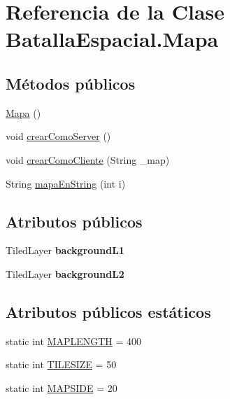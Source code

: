 \hypertarget{classBatallaEspacial_1_1Mapa}{
\section{Referencia de la Clase BatallaEspacial.Mapa}
\label{classBatallaEspacial_1_1Mapa}
}
\subsection*{Métodos públicos}
\begin{DoxyCompactItemize}
\item 
\hyperlink{classBatallaEspacial_1_1Mapa_a263ca7605285004b543d10fcfbec0539}{Mapa} ()
\item 
void \hyperlink{classBatallaEspacial_1_1Mapa_ace2f89758638fbe11ca1a0eed398602a}{crearComoServer} ()
\item 
void \hyperlink{classBatallaEspacial_1_1Mapa_ac69c177517360e24fe57a152615e0498}{crearComoCliente} (String \_\-map)
\item 
String \hyperlink{classBatallaEspacial_1_1Mapa_ad96b5ce682c66c4e8c60803a9c4c6e0c}{mapaEnString} (int i)
\end{DoxyCompactItemize}
\subsection*{Atributos públicos}
\begin{DoxyCompactItemize}
\item 
\hypertarget{classBatallaEspacial_1_1Mapa_aa452d9ae5f493e72cc34b623ed59f354}{
TiledLayer {\bfseries backgroundL1}}
\label{classBatallaEspacial_1_1Mapa_aa452d9ae5f493e72cc34b623ed59f354}

\item 
\hypertarget{classBatallaEspacial_1_1Mapa_a4d33bf24630a89471b56521e1058e5f3}{
TiledLayer {\bfseries backgroundL2}}
\label{classBatallaEspacial_1_1Mapa_a4d33bf24630a89471b56521e1058e5f3}

\end{DoxyCompactItemize}
\subsection*{Atributos públicos estáticos}
\begin{DoxyCompactItemize}
\item 
static int \hyperlink{classBatallaEspacial_1_1Mapa_ab3fe55574e94cce2eec78c8ae16f7e6f}{MAPLENGTH} = 400
\item 
static int \hyperlink{classBatallaEspacial_1_1Mapa_abd8ee7e7f142cb6eee0c4117e5a2e38a}{TILESIZE} = 50
\item 
static int \hyperlink{classBatallaEspacial_1_1Mapa_ae101340f9429d6fc9aae937c6764e355}{MAPSIDE} = 20
\end{DoxyCompactItemize}
